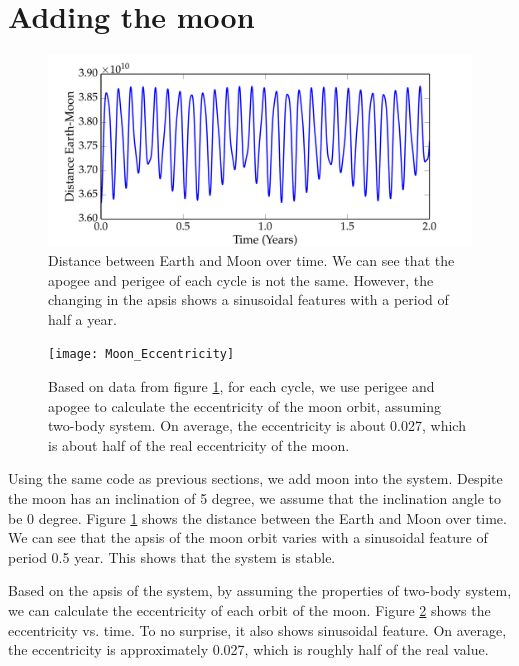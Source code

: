 \documentclass[11pt,letterpaper]{article}
\begin{document}
\section{Adding the moon}

\begin{figure}[h!]
	\centering
	\includegraphics[height = 0.3\textheight]{Moon_Apsis}
	\caption{Distance between Earth and Moon over time. We can see that the apogee and perigee of each cycle is not the same. However, the changing in the apsis shows a sinusoidal features with a period of half a year.}
	\label{fig:Moon_Apsis}
\end{figure}

\begin{figure}[h!]
	\centering
	\texttt{[image: Moon\_Eccentricity]}
	\caption{Based on data from figure \ref{fig:Moon_Apsis}, for each cycle, we use perigee and apogee to calculate the eccentricity of the moon orbit, assuming two-body system. On average, the eccentricity is about 0.027, which is about half of the real eccentricity of the moon.}
	\label{fig:Moon_Eccentricity}
\end{figure}

Using the same code as previous sections, we add moon into the system. Despite the moon has an inclination of 5 degree, we assume that the inclination angle to be 0 degree. Figure \ref{fig:Moon_Apsis} shows the distance between the Earth and Moon over time. We can see that the apsis of the moon orbit varies with a sinusoidal feature of period 0.5 year. This shows that the system is stable.

Based on the apsis of the system, by assuming the properties of two-body system, we can calculate the eccentricity of each orbit of the moon. Figure \ref{fig:Moon_Eccentricity} shows the eccentricity vs. time. To no surprise, it also shows sinusoidal feature. On average, the eccentricity is approximately 0.027, which is roughly half of the real value.
\end{document}
